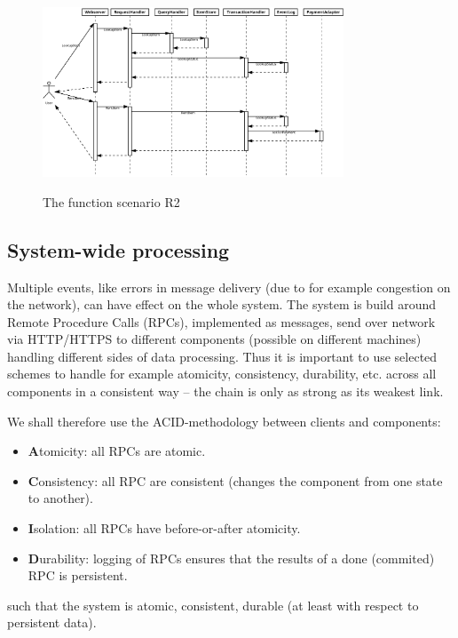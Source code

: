 \documentclass[a4paper,11pt]{report}
\begin{document}
\begin{figure}[ht]
    \centering
    \caption{The function scenario R2}
    \includegraphics[width=0.8\textwidth]{figures/r2-sequence}
    \label{fig:r2-sequence}
\end{figure}



\subsection{System-wide processing}
\label{sec:syst-wide-proc}
Multiple events, like errors in message delivery (due to for example congestion on the network), can have effect on the whole system.
The system is build around Remote Procedure Calls (RPCs), implemented as messages, send over network via HTTP/HTTPS to different components (possible on different machines) handling different sides of data processing. Thus it is important to use selected schemes to handle for example atomicity, consistency, durability, etc. across all components in a consistent way -- the chain is only as strong as its weakest link.

We shall therefore use the ACID-methodology between clients and components:
\begin{itemize}
    \item \textbf{A}tomicity: all RPCs are atomic.
    \item \textbf{C}onsistency: all RPC are consistent (changes the component from one state to another).
    \item \textbf{I}solation: all RPCs have before-or-after atomicity.
    \item \textbf{D}urability: logging of RPCs ensures that the results of a done (commited) RPC is persistent.
\end{itemize}
such that the system is atomic, consistent, durable (at least with respect to persistent data).
\end{document}
